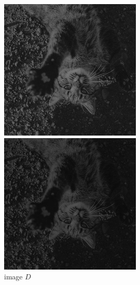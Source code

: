 \documentclass[12pt,a4paper,notitlepage,oneside,amsmath,amssymb]{article}
\begin{document}
\begin{CJK*}{UTF8}{bkai}
\begin{enumerate}[label=(\alph*)]
          \begin{figure}[hbt!]
            \centering
            \begin{minipage}{.25\textwidth}
              \centering
              \includegraphics[width=.95\linewidth]{imageD}
              \caption*{image \(D\)}
            \end{minipage}%
            \begin{minipage}{.25\textwidth}
              \centering
              \includegraphics[width=.95\linewidth]{imageE}

\end{minipage}
\end{figure}
\end{enumerate}
\end{CJK*}
\end{document}
